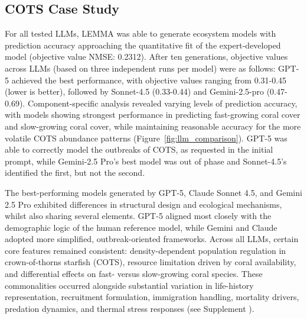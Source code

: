 \subsection{COTS Case Study}
\label{sec:cots_data}
For all tested LLMs, LEMMA was able to generate ecosystem models with prediction accuracy approaching the quantitative fit of the expert-developed model (objective value NMSE: 0.2312). After ten generations, objective values across LLMs (based on three independent runs per model) were as follows: GPT-5 achieved the best performance, with objective values ranging from 0.31-0.45 (lower is better), followed by Sonnet-4.5 (0.33-0.44) and Gemini-2.5-pro (0.47-0.69). Component-specific analysis revealed varying levels of prediction accuracy, with models showing strongest performance in predicting fast-growing coral cover and slow-growing coral cover, while maintaining reasonable accuracy for the more volatile COTS abundance patterns (Figure~\ref{fig:llm_comparison}). GPT-5 was able to correctly model the outbreaks of COTS, as requested in the initial prompt, while Gemini-2.5 Pro's best model was out of phase and Sonnet-4.5's identified the first, but not the second. 

The best-performing models generated by GPT-5, Claude Sonnet 4.5, and Gemini 2.5 Pro exhibited differences in structural design and ecological mechanisms, whilst also sharing several elements. GPT-5 aligned most closely with the demographic logic of the human reference model, while Gemini and Claude adopted more simplified, outbreak-oriented frameworks. Across all LLMs, certain core features remained consistent: density-dependent population regulation in crown-of-thorns starfish (COTS), resource limitation driven by coral availability, and differential effects on fast- versus slow-growing coral species. These commonalities occurred alongside substantial variation in life-history representation, recruitment formulation, immigration handling, mortality drivers, predation dynamics, and thermal stress responses (see Supplement%
).


